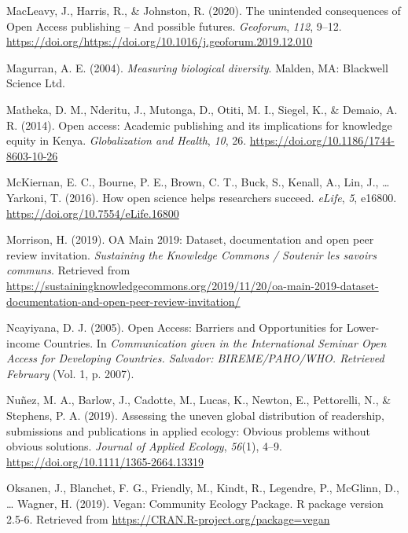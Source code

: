 \documentclass[english,man]{apa6}
\begin{document}
\leavevmode\hypertarget{ref-macleavy_unintended_2020}{}%
MacLeavy, J., Harris, R., \& Johnston, R. (2020). The unintended consequences of Open Access publishing -- And possible futures. \emph{Geoforum}, \emph{112}, 9--12. \url{https://doi.org/https://doi.org/10.1016/j.geoforum.2019.12.010}

\leavevmode\hypertarget{ref-magurran_measuring_2004}{}%
Magurran, A. E. (2004). \emph{Measuring biological diversity}. Malden, MA: Blackwell Science Ltd.

\leavevmode\hypertarget{ref-matheka_open_2014}{}%
Matheka, D. M., Nderitu, J., Mutonga, D., Otiti, M. I., Siegel, K., \& Demaio, A. R. (2014). Open access: Academic publishing and its implications for knowledge equity in Kenya. \emph{Globalization and Health}, \emph{10}, 26. \url{https://doi.org/10.1186/1744-8603-10-26}

\leavevmode\hypertarget{ref-mckiernan_how_2016}{}%
McKiernan, E. C., Bourne, P. E., Brown, C. T., Buck, S., Kenall, A., Lin, J., \ldots{} Yarkoni, T. (2016). How open science helps researchers succeed. \emph{eLife}, \emph{5}, e16800. \url{https://doi.org/10.7554/eLife.16800}

\leavevmode\hypertarget{ref-morrison_oa_2019}{}%
Morrison, H. (2019). OA Main 2019: Dataset, documentation and open peer review invitation. \emph{Sustaining the Knowledge Commons / Soutenir les savoirs communs}. Retrieved from \url{https://sustainingknowledgecommons.org/2019/11/20/oa-main-2019-dataset-documentation-and-open-peer-review-invitation/}

\leavevmode\hypertarget{ref-ncayiyana_open_2005}{}%
Ncayiyana, D. J. (2005). Open Access: Barriers and Opportunities for Lower-income Countries. In \emph{Communication given in the International Seminar Open Access for Developing Countries. Salvador: BIREME/PAHO/WHO. Retrieved February} (Vol. 1, p. 2007).

\leavevmode\hypertarget{ref-nunez_assessing_2019}{}%
Nuñez, M. A., Barlow, J., Cadotte, M., Lucas, K., Newton, E., Pettorelli, N., \& Stephens, P. A. (2019). Assessing the uneven global distribution of readership, submissions and publications in applied ecology: Obvious problems without obvious solutions. \emph{Journal of Applied Ecology}, \emph{56}(1), 4--9. \url{https://doi.org/10.1111/1365-2664.13319}

\leavevmode\hypertarget{ref-oksanen_vegan_2019}{}%
Oksanen, J., Blanchet, F. G., Friendly, M., Kindt, R., Legendre, P., McGlinn, D., \ldots{} Wagner, H. (2019). Vegan: Community Ecology Package. R package version 2.5-6. Retrieved from \url{https://CRAN.R-project.org/package=vegan}
\end{document}
